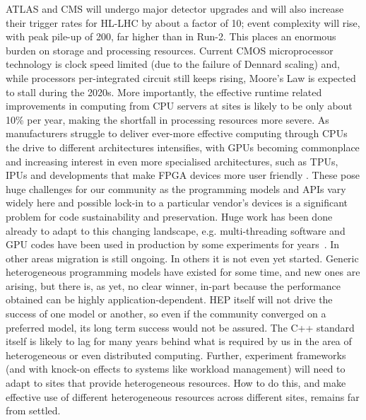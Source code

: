 \documentclass[11pt,a4paper]{article}
\begin{document}
ATLAS and CMS will undergo major detector upgrades and will also
increase their trigger rates for HL-LHC by about a factor of 10; event
complexity will rise, with peak pile-up of 200, far higher than in
Run-2. This places an enormous burden on storage and processing
resources. Current CMOS microprocessor technology is clock speed limited
(due to the failure of Dennard scaling) and, while processors
per-integrated circuit still keeps rising, Moore's Law is expected to
stall during the 2020s. More importantly, the effective runtime related
improvements in computing from CPU servers at sites is likely to be only
about 10\% per year, making the shortfall in processing resources more
severe. As manufacturers struggle to deliver ever-more effective
computing through CPUs the drive to different architectures intensifies,
with GPUs becoming commonplace and increasing interest in even more
specialised architectures, such as TPUs, IPUs and developments that make
FPGA devices more user friendly \cite{acm10.1145/3282307}.
These pose huge challenges for our
community as the programming models and APIs vary widely here and
possible lock-in to a particular vendor's devices is a significant
problem for code sustainability and preservation. Huge work has been
done already to adapt to this changing landscape, e.g. multi-threading
software and GPU codes have been used in production by some experiments
for years~\cite{calafiura2018hep, albrecht2018hepexec}.
In other areas migration is still ongoing. In others it is
not even yet started. Generic heterogeneous programming models have
existed for some time, and new ones are arising, but there is, as yet,
no clear winner, in-part because the performance obtained can be highly
application-dependent. HEP itself will not drive the success of one
model or another, so even if the community converged on a preferred
model, its long term success would not be assured. The C++ standard
itself is likely to lag for many years behind what is required by us in
the area of heterogeneous or even distributed computing. Further,
experiment frameworks (and with knock-on effects to systems like
workload management) will need to adapt to sites that provide
heterogeneous resources. How to do this, and make effective use of
different heterogeneous resources across different sites, remains far
from settled.
\end{document}
